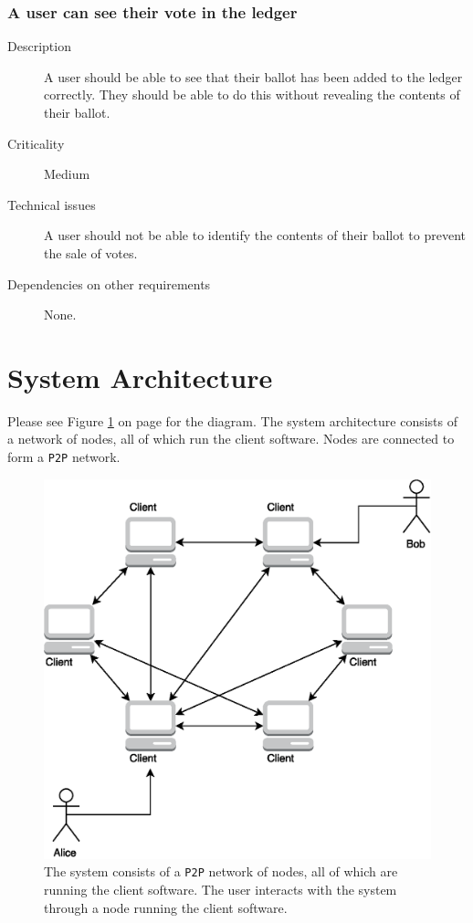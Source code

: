 \documentclass[a4paper,12pt]{article}
\begin{document}
\subsubsection{A user can see their vote in the ledger}
\label{sssec:vote-sys-view}
\begin{description}
	\item[Description]
		A user should be able to see that their ballot has been added to the ledger correctly. They should be able to do this without revealing the contents of their ballot.
	\item[Criticality]
		Medium
	\item[Technical issues]
		A user should not be able to identify the contents of their ballot to prevent the sale of votes.
	\item[Dependencies on other requirements]
		None.
\end{description}

\section{System Architecture}
Please see Figure \ref{fig:system-architecture} on page \pageref{fig:system-architecture} for the diagram. The system architecture consists of a network of nodes, all of which run the client software. Nodes are connected to form a \texttt{P2P} network.

\begin{figure}[ht]
\centering
\includegraphics[width=\textwidth]{SystemArchitecture.eps}
\caption{The system consists of a \texttt{P2P} network of nodes, all of which are running the client software. The user interacts with the system through a node running the client software.}
\label{fig:system-architecture}
\end{figure}
\end{document}
